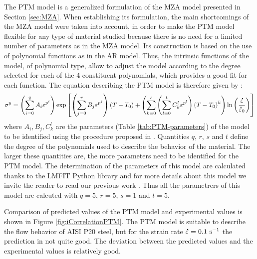 \documentclass[twoside,english,1p,final,sort&compress]{elsarticle}
\theoremstyle{plain}
\newcommand{\mdot}[1]{\accentset{\mbox{\bfseries .}}{#1}}
\newcommand{\ps}{\text{s}^{-1}}
\begin{document}
The PTM model \cite{TizeMha-2022} is a generalized formulation of the MZA model presented in Section \ref{sec:MZA}.
When establishing its formulation, the main shortcomings of the MZA model were taken into account, in order to make the PTM model flexible for any type of material studied because there is no need for a limited number of parameters as in the MZA model.
Its construction is based on the use of polynomial functions as in the AR model.
Thus, the intrinsic functions of the model, of polynomial type, allow to adjust the model according to the degree selected for each of the 4 constituent polynomials, which provides a good fit for each function.
The equation describing the PTM model is therefore given by :
\begin{equation}
\label{eq:PTM-model}
\sigma^y = \left(\sum_{i=0}^{q}{A_i\varepsilon^{p^i}}\right) \exp\left[\left(\sum_{j=0}^{r}{B_j\varepsilon^{p^j}}\right)\left(T-T_0\right) + \left(\sum_{k=0}^{s}\left(\sum_{l=0}^{t}{C_k^l\varepsilon^{p^l}} \right)\left(T-T_0\right)^k \right)\ln\left( \frac{\mdot\varepsilon}{\mdot{\varepsilon}_0}\right)\right]
\end{equation}
where $A_i, B_j, C_k^l$ are the parameters (Table \ref{tab:PTM-parameters}) of the model to be identified using the procedure proposed in  \cite{TizeMha-2022}.
Quantities $q$, $r$, $s$ and $t$ define the degree of the polynomials used to describe the behavior of the material.
The larger these quantities are, the more parameters need to be identified for the PTM model.
The determination of the parameters of this model are calculated thanks to the LMFIT Python library \cite{Newville-2016} and for more details about this model  we invite the reader to read our previous work \cite{TizeMha-2022}.
Thus all the parametrers of this model are calcuted with $q=5$, $r=5$, $s=1$ and $t=5$.

Comparison of predicted values of the PTM model and experimental values is shown in Figure \ref{fig:iCorrelationPTM}.
The PTM model is suitable to describe the ﬂow behavior of AISI P20 steel, but for the strain rate $\mdot\varepsilon = 0.1\ \ps$ the prediction in not quite good.
The deviation between the predicted values and the experimental values is relatively good.
\end{document}
